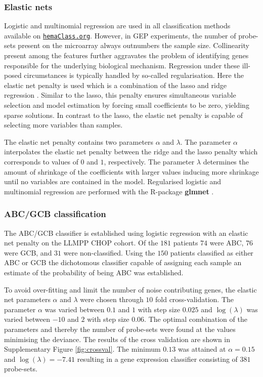 \documentclass[twocolumn]{bmcart}%
\newcommand{\hemaClass}{\href{http://hemaClass.org}{\texttt{hemaClass.org}}}
\newcommand{\R}{\textsf{R}}
\newcommand{\pkg}[1]{\textbf{#1}}
\begin{document}
\subsubsection{Elastic nets}
Logistic and multinomial regression are used in all classification methods available on \hemaClass{}.
However, in GEP experiments, the number of probe-sets present on the microarray always outnumbers the sample size.
Collinearity present among the features further aggravates the problem of identifying genes responsible for the underlying biological mechanism.
Regression under these ill-posed circumstances is typically handled by so-called regularisation.
Here the elastic net penalty \cite{Friedman2010, Zou2005} is used which is a combination of the lasso \cite{Tibshirani1996} and ridge regression \cite{Hoerl1970}.
Similar to the lasso, this penalty ensures simultaneous variable selection and model estimation by forcing small coefficients to be zero, yielding sparse solutions.
In contrast to the lasso, the elastic net penalty is capable of selecting more variables than samples.

The elastic net penalty contains two parameters $\alpha$ and $\lambda$.
The parameter $\alpha$ interpolates the elastic net penalty between the ridge and the lasso penalty which corresponds to values of $0$ and $1$, respectively.
The parameter $\lambda$ determines the amount of shrinkage of the coefficients with larger values inducing more shrinkage until no variables are contained in the model.
Regularised logistic and multinomial regression are performed with the \R{}-package \pkg{glmnet} \cite{Friedman2010}.



\subsubsection{ABC/GCB classification}
The ABC/GCB classifier is established using logistic regression with an elastic net penalty on the LLMPP CHOP cohort.
Of the $181$ patients $74$ were ABC, $76$ were GCB, and $31$ were non-classified.
Using the $150$ patients classified as either ABC or GCB the dichotomous classifier capable of assigning each sample an estimate of the probability of being ABC was established.

To avoid over-fitting and limit the number of noise contributing genes, the elastic net parameters $\alpha$ and $\lambda$ were chosen through $10$ fold cross-validation.
The parameter $\alpha$ was varied between $0.1$ and $1$ with step size $0.025$ and $\log(\lambda)$ was varied between $-10$ and $2$ with step size $0.06$.
The optimal combination of the parameters and thereby the number of probe-sets were found at the values minimising the deviance.
The results of the cross validation are shown in Supplementary Figure \ref{fig:crossval}.
The minimum $0.13$ was attained at $\alpha = 0.15$ and $\log(\lambda) = -7.41$ resulting in a gene expression classifier consisting of $381$ probe-sets.
\end{document}
